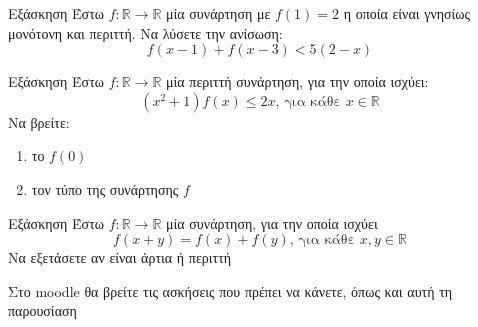 \documentclass[greek]{beamer}
\begin{document}
\begin{frame}{Εξάσκηση}
      Έστω $f:\mathbb{R}\to\mathbb{R}$ μία συνάρτηση με $f(1)=2$ η οποία είναι γνησίως μονότονη και περιττή. Να λύσετε την ανίσωση:
      $$f(x-1)+f(x-3)<5(2-x)$$
\end{frame}

\begin{frame}{Εξάσκηση}
      Έστω $f:\mathbb{R}\to\mathbb{R}$ μία περιττή συνάρτηση, για την οποία ισχύει:
      $$(x^2+1)f(x)\le 2x \text{, για κάθε } x\in\mathbb{R}$$
      Να βρείτε:
      \begin{enumerate}
            \item το $f(0)$ \pause
            \item τον τύπο της συνάρτησης $f$
      \end{enumerate}
\end{frame}

\begin{frame}{Εξάσκηση}
      Έστω $f:\mathbb{R}\to\mathbb{R}$ μία συνάρτηση, για την οποία ισχύει
      $$f(x+y)=f(x)+f(y)\text{, για κάθε } x,y\in\mathbb{R}$$
      Να εξετάσετε αν είναι άρτια ή περιττή
\end{frame}

\begin{frame}
      Στο moodle θα βρείτε τις ασκήσεις που πρέπει να κάνετε, όπως και αυτή τη παρουσίαση
\end{frame}
\end{document}
